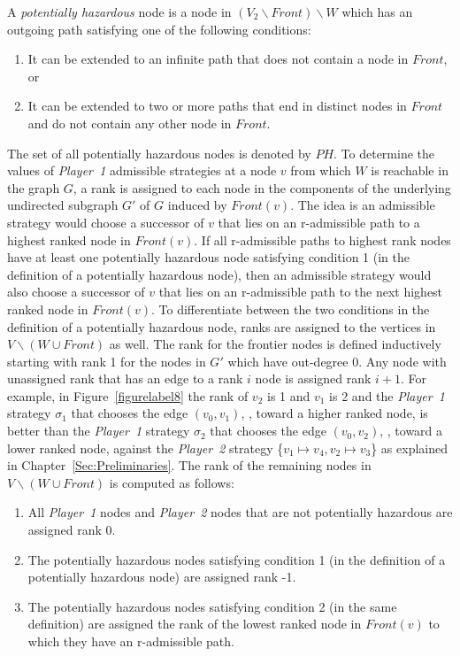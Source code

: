 A \textit{potentially hazardous} node is a node in $(V_{2} \backslash \mathit{Front}) \backslash W$ which has an outgoing path satisfying one of the following conditions:
\begin{enumerate}
	\item It can be extended to an infinite path that does not contain a node in $\mathit{Front}$, or
	\item It can be extended to two or more paths that end in distinct nodes in $\mathit{Front}$ and do not contain any other node in $\mathit{Front}$.
\end{enumerate}

The set of all potentially hazardous nodes is denoted by
$\mathit{PH}$. To determine the values of \textit{Player~1} admissible
strategies at a node $v$ from which $W$ is reachable in the graph $G$, a rank is assigned to each node in the components of the underlying
undirected subgraph $G'$ of $G$ induced by $\mathit{Front}(v)$. The
idea is an admissible strategy would choose a successor of $v$ that
lies on an r-admissible path to a highest ranked node in
$\mathit{Front}(v)$. If all r-admissible paths to highest rank nodes
have at least one potentially hazardous node satisfying condition 1
(in the definition of a potentially hazardous node), then an
admissible strategy would also choose a successor of $v$ that lies on
an r-admissible path to the next highest ranked node in
$\mathit{Front}(v)$. To differentiate between the two conditions in
the definition of a potentially hazardous node, ranks are assigned to the vertices in $V \backslash (W \cup \mathit{Front})$ as
well. The rank for the frontier nodes is defined inductively starting
with rank 1 for the nodes in $G'$ which have out-degree 0. Any node
with unassigned rank that has an edge to a rank $i$ node is assigned
rank $i+1$. For example, in Figure~\ref{figurelabel8} the rank of
$v_{2}$ is 1 and $v_{1}$ is 2 and the \textit{Player~1} strategy
$\sigma_{1}$ that chooses the edge $(v_{0},v_{1})$, \ie, toward a
higher ranked node, is better than the \textit{Player~1} strategy
$\sigma_{2}$ that chooses the edge $(v_{0},v_{2})$, \ie, toward a
lower ranked node, against the \textit{Player~2} strategy \{$v_{1}
\mapsto v_{4}, v_{2} \mapsto v_{3}$\} as explained in
Chapter~\ref{Sec:Preliminaries}. The rank of the remaining nodes in $V
\backslash(W \cup \mathit{Front})$ is computed as follows:
\begin{enumerate}
	\item All \textit{Player~1} nodes and \textit{Player~2} nodes that are
	not potentially hazardous are assigned rank 0.
	\item The potentially hazardous nodes satisfying condition 1 (in
	the definition of a potentially hazardous node) are assigned
	rank -1.
	\item The potentially hazardous nodes satisfying condition 2 (in
	the same definition) are assigned the rank of the lowest ranked
	node in $\mathit{Front}(v)$ to which they have an r-admissible path.
\end{enumerate}
